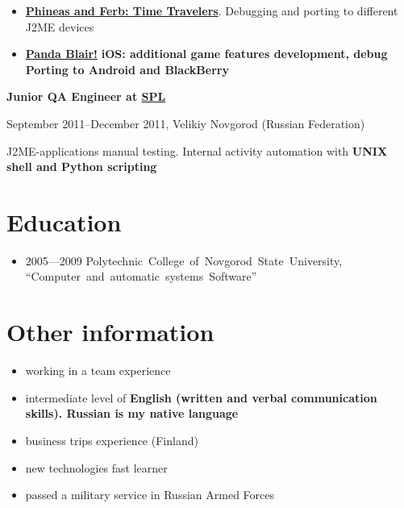 \begin{itemize}

\setlength{\itemindent}{20pt}
\item
    \href{http://java.mob.org/game/phineas\_and\_ferb\_time\_travelers.html}
        {\bfseries Phineas and Ferb: Time Travelers\mdseries}.
        Debugging and porting to different J2ME devices
\item
    \href{https://itunes.apple.com/us/app/panda-blair!/id500995558?mt=8}
        {\bfseries Panda Blair!\mdseries}
        \bfseries iOS\mdseries: additional game features development, debug
        Porting to \bfseries Android \mdseries and \bfseries BlackBerry\mdseries
\end{itemize}

\vspace{5pt}

{
\fontsize{12pt}{12pt}\selectfont
\bfseries Junior QA Engineer at
\href{http://spl.co}{\bfseries SPL\mdseries}
\mdseries
}

{
\fontsize{9pt}{8pt}\selectfont
September 2011--December 2011, Velikiy Novgorod (Russian Federation)
}

J2ME-applications manual testing. Internal activity automation with
\bfseries UNIX shell \mdseries and \bfseries Python \mdseries scripting

\section{Education}
\begin{itemize}
\item 2005---2009 Polytechnic~College~of~Novgorod~State~University,
``Computer~and~automatic~systems~Software''
\end{itemize}

\section{Other information}
\begin{itemize}
\item working in a team experience
\item intermediate level of \bfseries English \mdseries (written and verbal communication skills). Russian is my native language
\item business trips experience (Finland)
\item new technologies fast learner
\item passed a military service in Russian Armed Forces
\end{itemize}

